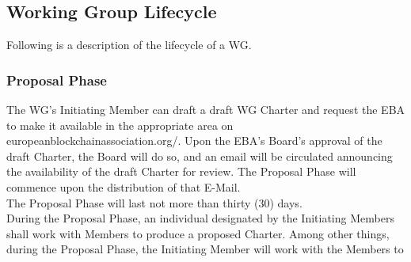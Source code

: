 \documentclass{article}
\begin{document}
\subsection{Working Group Lifecycle}

Following is a description of the lifecycle of a WG.

\subsubsection{Proposal Phase}

The WG's Initiating Member can draft a draft WG Charter and request the EBA to make it available in the appropriate area on europeanblockchainassociation.org/. 
Upon the EBA's Board's approval of the draft Charter, the Board will do so, and an email will be circulated announcing the availability of the draft Charter for review. 
The Proposal Phase will commence upon the distribution of that E-Mail. \\
The Proposal Phase will last not more than thirty (30) days. \\
During the Proposal Phase, an individual designated by the Initiating Members shall work with Members to produce a proposed Charter. 
Among other things, during the Proposal Phase, the Initiating Member will work with the Members to
\end{document}
